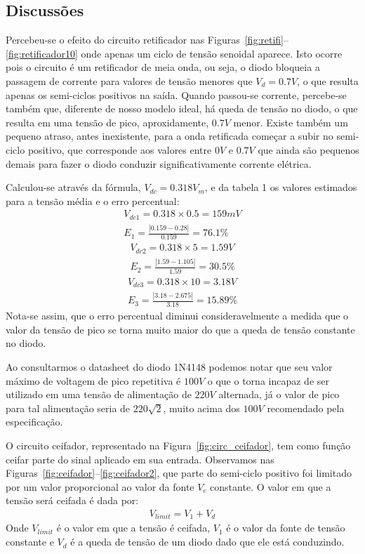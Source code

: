 \documentclass[12pt,a4paper]{article}
\begin{document}
\subsection{Discussões}
Percebeu-se o efeito do circuito retificador nas Figuras~\ref{fig:retifi}--\ref{fig:retificador10} onde apenas um ciclo de tensão senoidal aparece. Isto ocorre pois o circuito é um retificador de meia onda, ou seja, o diodo bloqueia a passagem de corrente para valores de tensão menores que $V_d=0.7V$, o que resulta apenas os semi-ciclos positivos na saída. Quando passou-se corrente, percebe-se também que, diferente de nosso modelo ideal, há queda de tensão no diodo, o que resulta em uma tensão de pico, aproxidamente, $0.7V$ menor. Existe também um pequeno atraso, antes inexistente, para a onda retificada começar a subir no semi-ciclo positivo, que corresponde aos valores entre $0V$ e $0.7V$ que ainda são pequenos demais para fazer o diodo conduzir significativamente corrente elétrica. 

Calculou-se através da fórmula, $V_{dc}=0.318V_{m}$, e da tabela 1 os valores estimados para a tensão média e o erro percentual:
\begin{align}
  V_{dc1}=0.318  \times 0.5 = 159 mV\\
  E_{1}=\frac{ |0.159-0.28 |}{ 0.159} = 76.1\% 
\end{align}
\begin{align}
  V_{dc2}=0.318  \times 5 = 1.59 V\\
  E_{2}=\frac{ |1.59-1.105 |}{ 1.59} = 30.5\% 
\end{align}
\begin{align}
  V_{dc3}=0.318  \times 10 = 3.18 V\\
  E_{3}=\frac{ |3.18-2.675 |}{ 3.18} = 15.89\% 
\end{align}
Nota-se assim, que o erro percentual diminui consideravelmente a medida que o valor da tensão de pico se torna muito maior do que a queda de tensão constante no diodo.

Ao consultarmos o datasheet do diodo 1N4148 podemos notar que seu valor máximo de voltagem de pico repetitiva é $100V$ o que o torna incapaz de ser utilizado em uma tensão de alimentação de $220V$ alternada, já o valor de pico para tal alimentação seria de $220\sqrt{2}$, muito acima dos $100V$ recomendado pela especificação.

O circuito ceifador, representado na Figura~\ref{fig:circ_ceifador}, tem como função ceifar parte do sinal aplicado em sua entrada. Observamos nas Figuras~\ref{fig:ceifador}--\ref{fig:ceifador2}, que parte do semi-ciclo positivo foi limitado por um valor proporcional ao valor da  fonte $V_{c}$ constante. O valor em que a tensão será ceifada é dada por:
\begin{align}
  V_{limit}= V_{1}+V_{d}
\end{align}
Onde $V_{limit}$ é o valor em que a tensão é ceifada, $V_{1}$ é o valor da fonte de tensão constante e $V_{d}$ é a queda de tensão de um diodo dado que ele está conduzindo.
\end{document}
